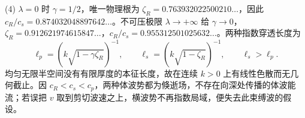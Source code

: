 (4) \(\lambda=0\) 时 \(\gamma=1/2\)，唯一物理根为 \(\zeta_R=0.763932022500210\ldots\)，因此 \(c_R/c_s=0.874032048897642\ldots\)。不可压极限 \(\lambda\to+\infty\) 给 \(\gamma\to0\)，\(\zeta_R=0.912621974615847\ldots\)，\(c_R/c_s=0.955312501025632\ldots\)。两种指数穿透长度为
\[
\ell_p=(k\sqrt{1-\gamma\zeta_R})^{-1},\qquad
\ell_s=(k\sqrt{1-\zeta_R})^{-1},\qquad \ell_s>\ell_p.
\]
均匀无限半空间没有有限厚度的本征长度，故在连续 \(k>0\) 上有线性色散而无几何截止。因 \(c_R<c_s<c_p\)，两种体波势都为倏逝场，不存在向深处传播的体波能流；若误把 \(v\) 取到剪切波速之上，横波势不再指数局域，便失去此束缚波的假设。
